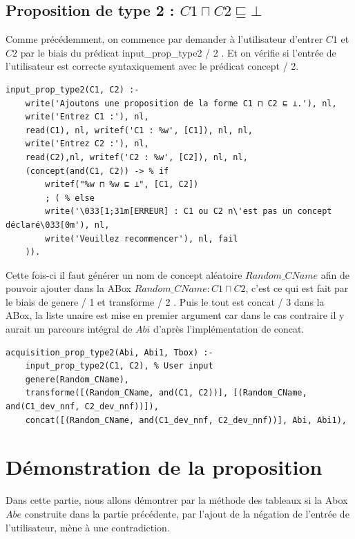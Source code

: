 \documentclass{article}
\begin{document}
\subsection{Proposition de type 2 : $ C1 \sqcap C2 \sqsubseteq \bot $ }
Comme précédemment, on commence par demander à l'utilisateur d'entrer $ C1 $ et $ C2 $ par le biais du prédicat \color{blue} input\_prop\_type2 / 2 \color{black}. Et on vérifie si l'entrée de l'utilisateur est correcte syntaxiquement avec le prédicat \color{blue}concept / 2\color{black}.
\begin{verbatim}
input_prop_type2(C1, C2) :-
    write('Ajoutons une proposition de la forme C1 ⊓ C2 ⊑ ⊥.'), nl,
    write('Entrez C1 :'), nl, 
    read(C1), nl, writef('C1 : %w', [C1]), nl, nl,
    write('Entrez C2 :'), nl, 
    read(C2),nl, writef('C2 : %w', [C2]), nl, nl,
    (concept(and(C1, C2)) -> % if 
        writef("%w ⊓ %w ⊑ ⊥", [C1, C2])
        ; ( % else
        write('\033[1;31m[ERREUR] : C1 ou C2 n\'est pas un concept déclaré\033[0m'), nl,
        write('Veuillez recommencer'), nl, fail
    )).
\end{verbatim}
Cette fois-ci il faut générer un nom de concept aléatoire $ Random\_CName $ afin de pouvoir ajouter dans la ABox $ Random\_CName : C1 \sqcap C2 $, c'est ce qui est fait par le biais de \color{blue} genere / 1 \color{black} et \color{blue} transforme / 2 \color{black}. Puis le tout est \color{blue} concat / 3 \color{black} dans la ABox, la liste unaire est mise en premier argument car dans le cas contraire il y aurait un parcours intégral de $Abi$ d'après l'implémentation de \color{blue}concat\color{black}.
\begin{verbatim}
acquisition_prop_type2(Abi, Abi1, Tbox) :- 
    input_prop_type2(C1, C2), % User input
    genere(Random_CName),
    transforme([(Random_CName, and(C1, C2))], [(Random_CName, and(C1_dev_nnf, C2_dev_nnf))]), 
    concat([(Random_CName, and(C1_dev_nnf, C2_dev_nnf))], Abi, Abi1), 
\end{verbatim}

\section{Démonstration de la proposition}
Dans cette partie, nous allons démontrer par la méthode des tableaux si la Abox $ Abe $ construite dans la partie précédente, par l'ajout de la négation de l'entrée de l'utilisateur, mène à une contradiction.
\end{document}
